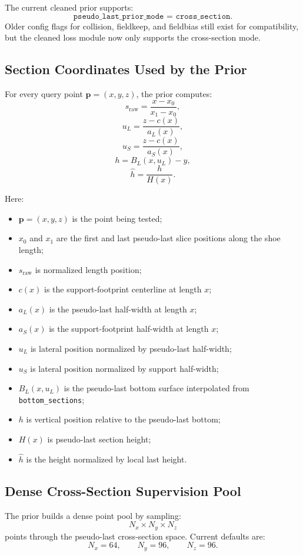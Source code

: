 \documentclass[11pt]{article}
\newcommand{\pt}{\mathbf{p}}
\begin{document}
The current cleaned prior supports:
\[
\texttt{pseudo\_last\_prior\_mode = cross\_section}.
\]
Older config flags for collision, fieldkeep, and fieldbias still exist for
compatibility, but the cleaned loss module now only supports the cross-section
mode.

\subsection{Section Coordinates Used by the Prior}

For every query point \(\pt=(x,y,z)\), the prior computes:
\[
s_{\text{raw}}=\frac{x-x_0}{x_1-x_0},
\]
\[
u_L=\frac{z-c(x)}{a_L(x)},
\]
\[
u_S=\frac{z-c(x)}{a_S(x)},
\]
\[
h=B_L(x,u_L)-y,
\]
\[
\hat{h}=\frac{h}{H(x)}.
\]

Here:
\begin{itemize}
    \item \(\pt=(x,y,z)\) is the point being tested;
    \item \(x_0\) and \(x_1\) are the first and last pseudo-last slice
    positions along the shoe length;
    \item \(s_{\text{raw}}\) is normalized length position;
    \item \(c(x)\) is the support-footprint centerline at length \(x\);
    \item \(a_L(x)\) is the pseudo-last half-width at length \(x\);
    \item \(a_S(x)\) is the support-footprint half-width at length \(x\);
    \item \(u_L\) is lateral position normalized by pseudo-last half-width;
    \item \(u_S\) is lateral position normalized by support half-width;
    \item \(B_L(x,u_L)\) is the pseudo-last bottom surface interpolated from
    \texttt{bottom\_sections};
    \item \(h\) is vertical position relative to the pseudo-last bottom;
    \item \(H(x)\) is pseudo-last section height;
    \item \(\hat{h}\) is the height normalized by local last height.
\end{itemize}

\subsection{Dense Cross-Section Supervision Pool}

The prior builds a dense point pool by sampling:
\[
N_x \times N_y \times N_z
\]
points through the pseudo-last cross-section space.  Current defaults are:
\[
N_x=64,\qquad N_y=96,\qquad N_z=96.
\]
\end{document}
